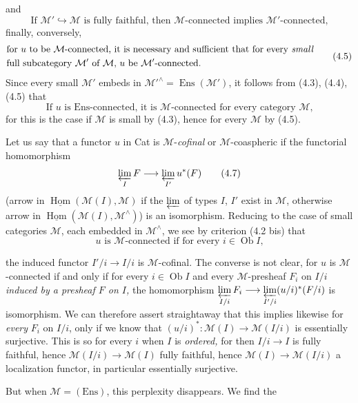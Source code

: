 \documentclass[11pt]{article}
\newcommand{\printedpage}[1]{\marginpar{\footnotesize p.~#1}}
\newcommand{\msp}[1]{\marginpar{\footnotesize [#1]}}
\newcommand{\uHom}{\underline{\operatorname{Hom}}}
\newcommand{\Ob}{\operatorname{Ob}}
\newcommand{\cM}{\mathcal{M}}
\begin{document}
\msp{page 50}
and
\[
\text{If $\cM' \hookrightarrow \cM$ is fully faithful, then $\cM$-connected implies $\cM'$-connected,}
\tag*{(4.4)}
\]
finally, conversely,
\[
\begin{aligned}
&\text{for $u$ to be $\cM$-connected, it is necessary and sufficient that for every \textit{small}}\\
&\text{full subcategory $\cM'$ of $\cM$, $u$ be $\cM'$-connected.}
\end{aligned}
\tag*{(4.5)}
\]
Since every small $\cM'$ embeds in $\cM'^\wedge = \operatorname{Ens}(\cM')$, it follows from (4.3), (4.4), (4.5) that
\[
\text{If $u$ is Ens-connected, it is $\cM$-connected for every category $\cM$,}
\tag*{(4.6)}
\]
for this is the case if $\cM$ is small by (4.3), hence for every $\cM$ by (4.5).

Let us say that a functor $u$ in Cat is $\cM$-\textit{cofinal} or $\cM$-coaspheric if the functorial homomorphism
\[
\varprojlim_{I} F \longrightarrow \varprojlim_{I'} u^*(F)
\tag*{(4.7)}
\]
(arrow in $\uHom(\cM(I), \cM)$ if the $\varprojlim$ of types $I$, $I'$ exist in $\cM$, otherwise arrow in $\uHom(\cM(I), \cM^\wedge)$) is an isomorphism. Reducing to the case of small categories $\cM$, each embedded in $\cM^\wedge$, we see by criterion (4.2 bis) that
\[
\text{$u$ is $\cM$-connected if for every $i \in \Ob I$,}
\tag*{(4.8)}
\]

\printedpage{33}
\msp{page 51}
the induced functor $I'/i \longrightarrow I/i$ is $\cM$-cofinal. The converse is not clear, for $u$ is $\cM$-connected if and only if for every $i \in \Ob I$ and every $\cM$-presheaf $F_i$ on $I/i$ \textit{induced by a presheaf $F$ on $I$,} the homomorphism $\varprojlim\limits_{I/i} F_i \longrightarrow \varprojlim\limits_{I'/i} (u/i)^*(F/i)$ is isomorphism. We can therefore assert straightaway that this implies likewise for \textit{every} $F_i$ on $I/i$, only if we know that $(u/i)^* : \cM(I) \longrightarrow \cM(I/i)$ is essentially surjective. This is so for every $i$ when $I$ is \textit{ordered,} for then $I/i \longrightarrow I$ is fully faithful, hence $\cM(I/i) \longrightarrow \cM(I)$ fully faithful, hence $\cM(I) \longrightarrow \cM(I/i)$ a localization functor, in particular essentially surjective.

\msp{page 52}
But when $\cM = (\text{Ens})$, this perplexity disappears. We find the
\end{document}
